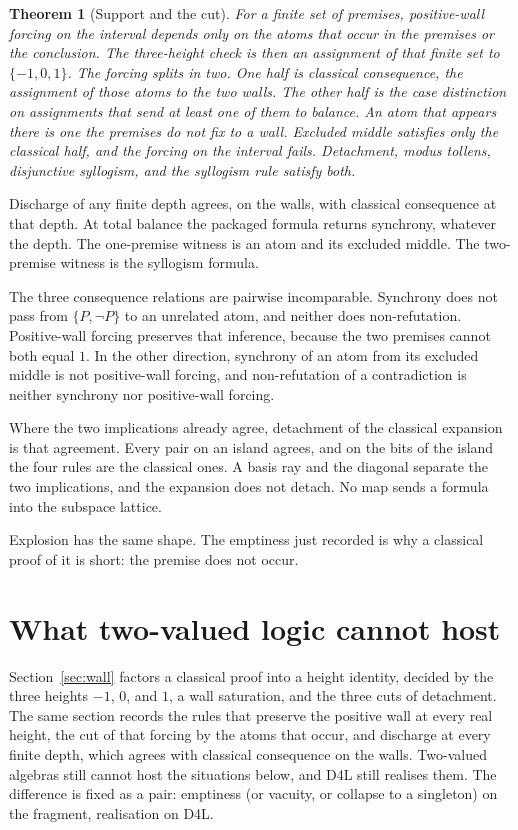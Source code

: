 \documentclass[a4paper]{article}
\newtheorem{theorem}{Theorem}[section]
\theoremstyle{definition}
\begin{document}
\begin{theorem}[Support and the cut]
\label{thm:cut}
For a finite set of premises, positive-wall forcing on the interval
depends only on the atoms that occur in the premises or the conclusion.
The three-height check is then an assignment of that finite set to
\(\{-1,0,1\}\). The forcing splits in two. One half is classical
consequence, the assignment of those atoms to the two walls. The other
half is the case distinction on assignments that send at least one of
them to balance. An atom that appears there is one the premises do not
fix to a wall. Excluded middle satisfies only the classical half, and
the forcing on the interval fails. Detachment, modus tollens,
disjunctive syllogism, and the syllogism rule satisfy both.
\end{theorem}

Discharge of any finite depth agrees, on the walls, with classical
consequence at that depth. At total balance the packaged formula returns
synchrony, whatever the depth. The one-premise witness is an atom and
its excluded middle. The two-premise witness is the syllogism formula.

The three consequence relations are pairwise incomparable. Synchrony
does not pass from \(\{P,\neg P\}\) to an unrelated atom, and neither
does non-refutation. Positive-wall forcing preserves that inference,
because the two premises cannot both equal \(1\). In the other
direction, synchrony of an atom from its excluded middle is not
positive-wall forcing, and non-refutation of a contradiction is neither
synchrony nor positive-wall forcing.

Where the two implications already agree, detachment of the classical
expansion is that agreement. Every pair on an island agrees, and on the
bits of the island the four rules are the classical ones. A basis ray
and the diagonal separate the two implications, and the expansion does
not detach. No map sends a formula into the subspace lattice.

Explosion has the same shape. The emptiness just recorded is why a
classical proof of it is short: the premise does not occur.

\section{What two-valued logic cannot host}
\label{sec:examples}

Section~\ref{sec:wall} factors a classical proof into a height identity,
decided by the three heights \(-1\), \(0\), and \(1\), a wall saturation,
and the three cuts of detachment. The same section records the rules
that preserve the positive wall at every real height, the cut of that
forcing by the atoms that occur, and discharge at every finite depth,
which agrees with classical consequence on the walls. Two-valued algebras still cannot host the
situations below, and D4L still realises them. The difference is fixed
as a pair: emptiness (or vacuity, or collapse to a singleton) on the
fragment, realisation on D4L.
\end{document}
